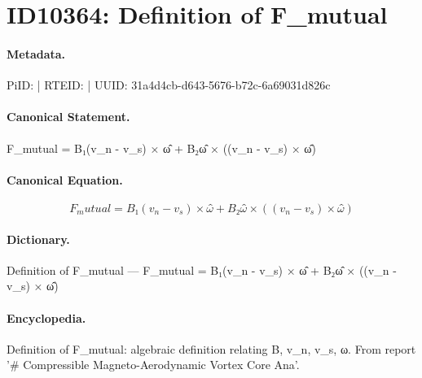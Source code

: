 \section*{ID10364: Definition of F\_mutual}
\paragraph{Metadata.}
PiID:  | RTEID:  | UUID: 31a4d4cb-d643-5676-b72c-6a69031d826c

\paragraph{Canonical Statement.}
F\_mutual = B₁(v\_n - v\_s) × ω̂ + B₂ω̂ × ((v\_n - v\_s) × ω̂)

\paragraph{Canonical Equation.}
\[
F_mutual = B₁(v_n - v_s) × ω̂ + B₂ω̂ × ((v_n - v_s) × ω̂)
\]

\paragraph{Dictionary.}
Definition of F\_mutual — F\_mutual = B₁(v\_n - v\_s) × ω̂ + B₂ω̂ × ((v\_n - v\_s) × ω̂)

\paragraph{Encyclopedia.}
Definition of F\_mutual: algebraic definition relating B, v\_n, v\_s, ω. From report '\# Compressible Magneto-Aerodynamic Vortex Core Ana'.
